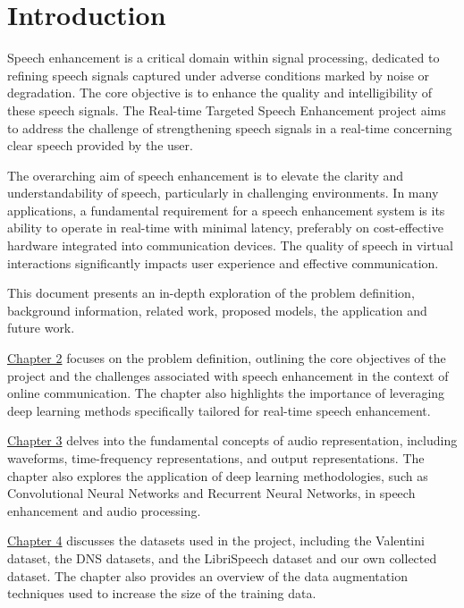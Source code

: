 \chapter{Introduction}
\label{chap:intro}

\begingroup
\let\clearpage\relax

Speech enhancement is a critical domain within signal processing, dedicated to refining speech signals captured under adverse conditions marked by noise or degradation. The core objective is to enhance the quality and intelligibility of these speech signals. The Real-time Targeted Speech Enhancement project aims to address the challenge of strengthening speech signals in a real-time concerning clear speech provided by the user.

The overarching aim of speech enhancement is to elevate the clarity and understandability of speech, particularly in challenging environments. In many applications, a fundamental requirement for a speech enhancement system is its ability to operate in real-time with minimal latency, preferably on cost-effective hardware integrated into communication devices. The quality of speech in virtual interactions significantly impacts user experience and effective communication.

This document presents an in-depth exploration of the problem definition, background information, related work, proposed models, the application and future work.

\hyperref[chap:problem-def]{Chapter 2} focuses on the problem definition, outlining the core objectives of the project and the challenges associated with speech enhancement in the context of online communication. The chapter also highlights the importance of leveraging deep learning methods specifically tailored for real-time speech enhancement.

\hyperref[chap:background]{Chapter 3} delves into the fundamental concepts of audio representation, including waveforms, time-frequency representations, and output representations. The chapter also explores the application of deep learning methodologies, such as Convolutional Neural Networks and Recurrent Neural Networks, in speech enhancement and audio processing.

\hyperref[chap:datasets]{Chapter 4} discusses the datasets used in the project, including the Valentini dataset, the DNS datasets, and the LibriSpeech dataset and our own collected dataset. The chapter also provides an overview of the data augmentation techniques used to increase the size of the training data.

